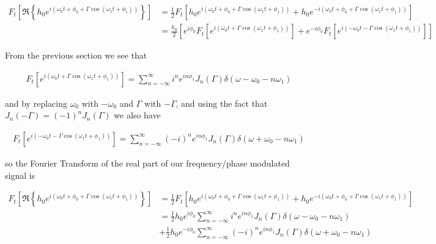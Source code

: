 \documentclass[twocolumn, groupedaddress]{revtex4-1}
\begin{document}
\begin{align}
F_t \left[ \Re \left\{ h_0 e^{i\left( \omega_0 t + \phi_0 + \Gamma \cos( \omega_1 t + \phi_1 ) \right)} \right\} \right]
&= \frac{1}{2} F_t \left[ h_0 e^{i\left( \omega_0 t + \phi_0 + \Gamma \cos( \omega_1 t + \phi_1 ) \right)} 
                        + h_0 e^{-i\left( \omega_0 t + \phi_0 + \Gamma \cos( \omega_1 t + \phi_1 ) \right)} \right]			\\
&= \frac{h_0}{2} \left[ 
  e^{ i\phi_0} F_t \left[ e^{i\left(  \omega_0 t + \Gamma \cos( \omega_1 t + \phi_1 ) \right)} \right] 
+ e^{-i\phi_0} F_t \left[ e^{i\left( -\omega_0 t - \Gamma \cos( \omega_1 t + \phi_1 ) \right)} \right] 
\right]
\end{align}

From the previous section we see that

\begin{align}
F_t \left[ e^{i(\omega_0 t + \Gamma \cos(\omega_1 t + \phi_1))} \right] 
= \sum_{n=-\infty}^{\infty} i^n e^{in\phi_1} J_n(\Gamma)  \delta(\omega - \omega_0 - n\omega_1)
\end{align}

and by replacing $\omega_0$ with $-\omega_0$ and $\Gamma$ with $-\Gamma$, and using the fact that $J_n(-\Gamma) = (-1)^n J_n (\Gamma)$ we also have

\begin{align}
F_t \left[ e^{i(-\omega_0 t - \Gamma \cos(\omega_1 t + \phi_1))} \right] 
= \sum_{n=-\infty}^{\infty} (-i)^n e^{in\phi_1} J_n(\Gamma)  \delta(\omega + \omega_0 - n\omega_1)
\end{align}

so the Fourier Transform of the real part of our frequency/phase modulated signal is

\begin{align}
F_t \left[ \Re \left\{ h_0 e^{i\left( \omega_0 t + \phi_0 + \Gamma \cos( \omega_1 t + \phi_1 ) \right)} \right\} \right]
&= \frac{1}{2} F_t \left[ h_0 e^{i\left( \omega_0 t + \phi_0 + \Gamma \cos( \omega_1 t + \phi_1 ) \right)} 
                        + h_0 e^{-i\left( \omega_0 t + \phi_0 + \Gamma \cos( \omega_1 t + \phi_1 ) \right)} \right]				\\
&= \frac{1}{2} h_0 e^{ i\phi_0} \sum_{n=-\infty}^{\infty} i^n e^{in\phi_1} J_n(\Gamma)  \delta(\omega - \omega_0 - n\omega_1)		\\
&+ \frac{1}{2} h_0 e^{-i\phi_0} \sum_{n=-\infty}^{\infty} (-i)^n e^{in\phi_1} J_n(\Gamma)  \delta(\omega + \omega_0 - n\omega_1)
\end{align}
\end{document}
